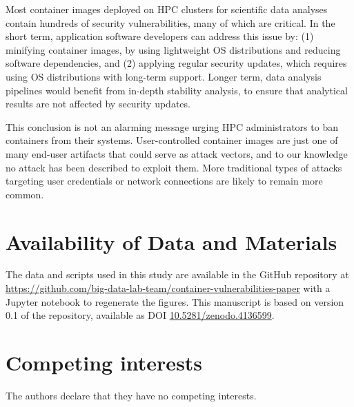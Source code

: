 \documentclass[a4paper,num-refs]{oup-contemporary}
\begin{document}
Most container images deployed on HPC clusters for scientific data analyses
contain hundreds of security vulnerabilities, many of which are critical.
In the short term, application software developers can address this issue
by: (1) minifying container images, by using lightweight OS distributions
and reducing software dependencies, and (2) applying regular security
updates, which requires using OS distributions with long-term support.
Longer term, data analysis pipelines would benefit from in-depth stability
analysis, to ensure that analytical results are not affected by security
updates.

This conclusion is not an alarming message urging HPC administrators  
to ban containers from their systems. User-controlled container images are
just one of many end-user artifacts that could serve as attack vectors, and
to our knowledge no attack has been described to exploit them. More
traditional types of attacks targeting user credentials or network
connections are likely to remain more common.

\section{Availability of Data and Materials}

The data and scripts used in this study are available in the GitHub repository at
\url{https://github.com/big-data-lab-team/container-vulnerabilities-paper}
with a Jupyter notebook to regenerate the figures. This manuscript is based on 
version 0.1 of the repository, available as DOI \href{https://doi.org/10.5281/zenodo.4136599}{10.5281/zenodo.4136599}.


\section{Competing interests}

The authors declare that they have no competing interests.


\end{document}
